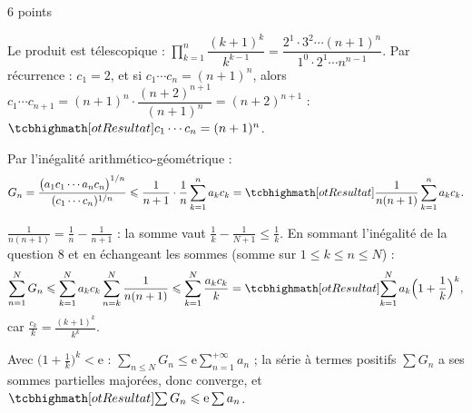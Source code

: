 \begin{corrigeEval}{6 points}{}
\begin{questions}[start=7]
  \item Le produit est télescopique :
    $\prod_{k=1}^{n}\dfrac{(k+1)^{k}}{k^{k-1}}=\dfrac{2^{1}\cdot3^{2}\cdots(n+1)^{n}}{1^{0}\cdot2^{1}\cdots n^{n-1}}$.
    Par récurrence : $c_1=2$, et si $c_1\cdots c_n=(n+1)^{n}$, alors
    $c_1\cdots c_{n+1}=(n+1)^{n}\cdot\dfrac{(n+2)^{n+1}}{(n+1)^{n}}=(n+2)^{n+1}$ :
    $\res{c_1\cdots c_n=(n+1)^{n}}$. \pts{1 pt}
  \item Par l'inégalité arithmético-géométrique :
    \[G_n=\frac{\bigl(a_1c_1\cdots a_nc_n\bigr)^{1/n}}{(c_1\cdots c_n)^{1/n}}
      \leqslant\frac{1}{n+1}\cdot\frac1n\sum_{k=1}^{n}a_kc_k
      =\res{\frac{1}{n(n+1)}\sum_{k=1}^{n}a_kc_k}.\]
  \item $\frac{1}{n(n+1)}=\frac1n-\frac1{n+1}$ : la somme vaut
    $\frac1k-\frac1{N+1}\leqslant\frac1k$. En sommant l'inégalité de la
    question 8 et en échangeant les sommes (somme sur $1\leqslant k\leqslant n\leqslant N$) :
    \[\sum_{n=1}^{N}G_n\leqslant\sum_{k=1}^{N}a_kc_k\sum_{n=k}^{N}\frac{1}{n(n+1)}
      \leqslant\sum_{k=1}^{N}\frac{a_kc_k}{k}=\res{\sum_{k=1}^{N}a_k\Bigl(1+\frac1k\Bigr)^{k}},\]
    car $\frac{c_k}{k}=\frac{(k+1)^{k}}{k^{k}}$. 
  \item Avec $\bigl(1+\frac1k\bigr)^{k}<\mathrm{e}$ :
    $\sum_{n\leqslant N}G_n\leqslant\mathrm{e}\sum_{n=1}^{+\infty}a_n$ ; la série
    à termes positifs $\sum G_n$ a ses sommes partielles majorées, donc
    converge, et $\res{\sum G_n\leqslant\mathrm{e}\sum a_n}$. 
\end{questions}
\end{corrigeEval}

